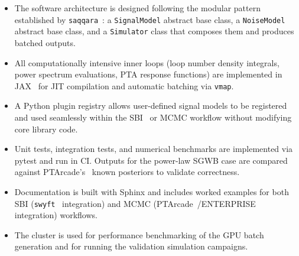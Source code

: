 \begin{itemize}
    \item The software architecture is designed following the modular pattern established by \texttt{saqqara}~\cite{alvey_simulationbased_2024}: a \texttt{SignalModel} abstract base class, a \texttt{NoiseModel} abstract base class, and a \texttt{Simulator} class that composes them and produces batched outputs.
    \item All computationally intensive inner loops (loop number density integrals, power spectrum evaluations, PTA response functions) are implemented in JAX~\cite{bradbury_jax_2018} for JIT compilation and automatic batching via \texttt{vmap}.
    \item A Python plugin registry allows user-defined signal models to be registered and used seamlessly within the SBI~\cite{cranmer_frontier_2020} or MCMC workflow without modifying core library code.
    \item Unit tests, integration tests, and numerical benchmarks are implemented via pytest and run in CI. Outputs for the power-law SGWB case are compared against PTArcade's~\cite{mitridate_ptarcade_2023a} known posteriors to validate correctness.
    \item Documentation is built with Sphinx and includes worked examples for both SBI (\texttt{swyft}~\cite{miller_swyft_2022} integration) and MCMC (PTArcade~\cite{mitridate_ptarcade_2023a}/ENTERPRISE~\cite{ellis_enterprise_2020} integration) workflows.
    \item The cluster is used for performance benchmarking of the GPU batch generation and for running the validation simulation campaigns.
\end{itemize}